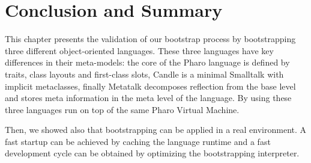 \section{Conclusion and Summary}

This chapter presents the validation of our bootstrap process by bootstrapping three different object-oriented languages. These three languages have key differences in their meta-models: the core of the Pharo language is defined by traits, class layouts and first-class slots, Candle is a minimal Smalltalk with implicit metaclasses, finally Metatalk decomposes reflection from the base level and stores meta information in the meta level of the language. By using \Vtt these three languages run on top of the same Pharo Virtual Machine.

Then, we showed also that bootstrapping can be applied in a real environment. A fast startup can be achieved by caching the language runtime and a fast development cycle can be obtained by optimizing the bootstrapping interpreter.
